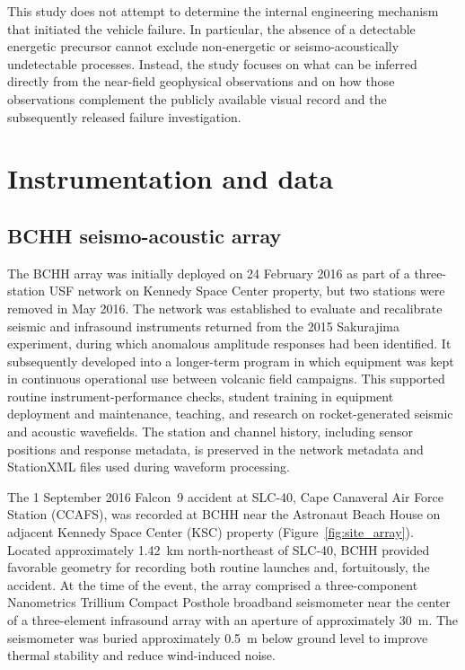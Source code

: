 \documentclass[]{seismica}
\begin{document}
This study does not attempt to determine the internal engineering mechanism
that initiated the vehicle failure. In particular, the absence of a detectable
energetic precursor cannot exclude non-energetic or seismo-acoustically
undetectable processes. Instead, the study focuses on what can be inferred
directly from the near-field geophysical observations and on how those
observations complement the publicly available visual record and the
subsequently released failure investigation.


\section{Instrumentation and data}
\label{sec:data}

\subsection{BCHH seismo-acoustic array}

The BCHH array was initially deployed on 24 February 2016 as part of a
three-station USF network on Kennedy Space Center property, but two stations
were removed in May 2016. The network was established to evaluate and
recalibrate seismic and infrasound instruments returned from the 2015
Sakurajima experiment, during which anomalous amplitude responses had been
identified. It subsequently developed into a longer-term program in which
equipment was kept in continuous operational use between volcanic field
campaigns. This supported routine instrument-performance checks, student
training in equipment deployment and maintenance, teaching, and research on
rocket-generated seismic and acoustic wavefields. The station and channel history, 
including sensor positions and response metadata, is preserved in the network 
metadata and StationXML files used during waveform processing.

The 1 September 2016 Falcon~9 accident at SLC-40, Cape Canaveral Air Force
Station (CCAFS), was recorded at BCHH near the Astronaut Beach House on
adjacent Kennedy Space Center (KSC) property
(Figure~\ref{fig:site_array}). Located approximately 1.42~km
north-northeast of SLC-40, BCHH provided favorable geometry for recording
both routine launches and, fortuitously, the accident. At the time of the
event, the array comprised a three-component Nanometrics Trillium Compact
Posthole broadband seismometer near the center of a three-element infrasound
array with an aperture of approximately 30~m. The seismometer was buried
approximately 0.5~m below ground level to improve thermal stability and reduce
wind-induced noise.
\end{document}
